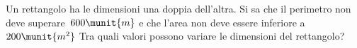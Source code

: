 \begin{esercizio}[*]
\label{ese:21.32}
Un rettangolo ha le dimensioni una doppia dell'altra.
Si sa che il perimetro non deve superare~\(600\munit{m}\) e che
l'area non deve essere inferiore a~\(200\munit{m^2}\) Tra quali
valori possono variare le dimensioni del rettangolo?\\
\end{esercizio}

% 
% 
% 
% 
% 


